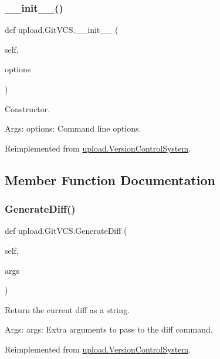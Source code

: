 \subsubsection{\texorpdfstring{\_\_init\_\_()}{\_\_init\_\_()}\hspace{0.1cm}{\footnotesize\ttfamily [2/2]}}
{\footnotesize\ttfamily def upload.\+Git\+V\+C\+S.\+\_\+\+\_\+init\+\_\+\+\_\+ (\begin{DoxyParamCaption}\item[{}]{self,  }\item[{}]{options }\end{DoxyParamCaption})}

\begin{DoxyVerb}Constructor.

Args:
  options: Command line options.
\end{DoxyVerb}
 

Reimplemented from \mbox{\hyperlink{classupload_1_1_version_control_system_ace97e5785a2b40011404ae6fbb956ecf}{upload.\+Version\+Control\+System}}.



\subsection{Member Function Documentation}
\mbox{\label{classupload_1_1_git_v_c_s_a3ebfc01cebc9b585706ad3f4389a8833}} 
\subsubsection{\texorpdfstring{GenerateDiff()}{GenerateDiff()}\hspace{0.1cm}{\footnotesize\ttfamily [1/2]}}
{\footnotesize\ttfamily def upload.\+Git\+V\+C\+S.\+Generate\+Diff (\begin{DoxyParamCaption}\item[{}]{self,  }\item[{}]{args }\end{DoxyParamCaption})}

\begin{DoxyVerb}Return the current diff as a string.

Args:
  args: Extra arguments to pass to the diff command.
\end{DoxyVerb}
 

Reimplemented from \mbox{\hyperlink{classupload_1_1_version_control_system_aa5eb260c96e7016dab36b5fc136c9f49}{upload.\+Version\+Control\+System}}.


